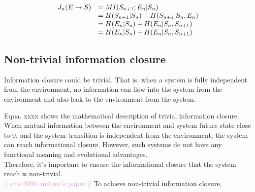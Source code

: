 \documentclass[utf8]{frontiersSCNS}
\newcommand{\temp}[1]{\textcolor{Plum}{[[ #1 ]]\newline}}
\begin{document}
		\begin{equation}
			\left.\begin{array} { r l } { J _ { n } ( E \rightarrow S ) } & { = M I ( S _ { n + 1} ; E _ { n } | S _ { n } ) } \\ { } & { = H ( S _ { n + 1} | S _ { n } ) - H ( S _ { n + 1} | S _ { n } ,E _ { n } ) } \\ { } & { = H ( E _ { n } | S _ { n } ) - H ( E _ { n } | S _ { n } ,S _ { n + 1} ) } \\ { } & { = H ( E _ { n } | S _ { n } ) - H ( E _ { n } | S _ { n } ,S _ { n + 1} ) } \end{array} \right.
		\end{equation}
	
	
	
	
	
	\subsection{Non-trivial information closure}
	Information closure could be trivial. That is, when a system is fully independent from the environment, no information can flow into the system from the environment and also leak to the environment from the system. 
	
	Equa. xxxx shows the mathematical description of trivial information closure. When mutual information between the environment and system future state close to 0, and the system transition is independent from the environment, the system can reach informational closure. However, such systems do not have any functional meaning and evolutional advantages. \\
	Therefore, it's important to ensure the informational closure that the system reach is non-trivial.\\
	
	\temp{cite 2006 and nic's paper}
	To achieve non-trivial information closure, \\
	\citep{BERTSCHINGER.2006}\\
	\citep{guttenberg2016neural}
	
	
	
\end{document}

